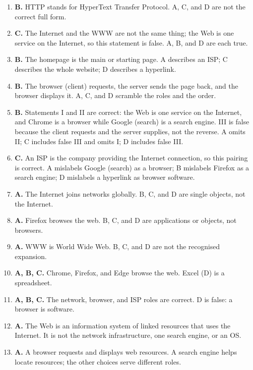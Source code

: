 \begin{enumerate}[label=\textbf{Q\arabic*.}, leftmargin=*]
  not expansions of the abbreviation.
\item \textbf{B.} HTTP stands for HyperText Transfer Protocol. A, C, and D
  are not the correct full form.
\item \textbf{C.} The Internet and the WWW are not the same thing; the Web is
  one service on the Internet, so this statement is false. A, B, and D are
  each true.
\item \textbf{B.} The homepage is the main or starting page. A describes an
  ISP; C describes the whole website; D describes a hyperlink.
\item \textbf{B.} The browser (client) requests, the server sends the page
  back, and the browser displays it. A, C, and D scramble the roles and the
  order.
\item \textbf{B.} Statements I and II are correct: the Web is one service on
  the Internet, and Chrome is a browser while Google (search) is a search
  engine. III is false because the client requests and the server supplies,
  not the reverse. A omits II; C includes false III and omits I; D includes
  false III.
\item \textbf{C.} An ISP is the company providing the Internet connection, so
  this pairing is correct. A mislabels Google (search) as a browser; B
  mislabels Firefox as a search engine; D mislabels a hyperlink as browser
  software.

\item \textbf{A.} The Internet joins networks globally. B, C, and D are single objects, not the Internet.
\item \textbf{A.} Firefox browses the web. B, C, and D are applications or objects, not browsers.
\item \textbf{A.} WWW is World Wide Web. B, C, and D are not the recognised expansion.
\item \textbf{A, B, C.} Chrome, Firefox, and Edge browse the web. Excel (D) is a spreadsheet.
\item \textbf{A, B, C.} The network, browser, and ISP roles are correct. D is false: a browser is software.
\item \textbf{A.} The Web is an information system of linked resources that uses the Internet. It is not the network infrastructure, one search engine, or an OS.

\item \textbf{A.} A browser requests and displays web resources. A search engine helps locate resources; the other choices serve different roles.


\end{enumerate}
